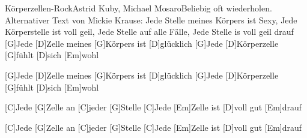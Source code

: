 \documentclass[../main.tex]{subfiles}
\begin{document}
\begin{songwithoutpagebreak}[5]{Körperzellen-Rock}{Astrid Kuby, Michael Mosaro}{Beliebig oft wiederholen.\\Alternativer Text von Mickie Krause: Jede Stelle meines Körpers ist Sexy, Jede Körperstelle ist voll geil, Jede Stelle auf alle Fälle, Jede Stelle is voll geil drauf}
[G]Jede [D]Zelle meines [G]Körpers ist [D]glücklich
[G]Jede [D]Körperzelle [G]fühlt [D]sich [Em]wohl

[G]Jede [D]Zelle meines [G]Körpers ist [D]glücklich
[G]Jede [D]Körperzelle [G]fühlt [D]sich [Em]wohl

[C]Jede [G]Zelle an [C]jeder [G]Stelle
[C]Jede [Em]Zelle ist [D]voll gut [Em]drauf

[C]Jede [G]Zelle an [C]jeder [G]Stelle
[C]Jede [Em]Zelle ist [D]voll gut [Em]drauf
\end{songwithoutpagebreak}
\end{document}

